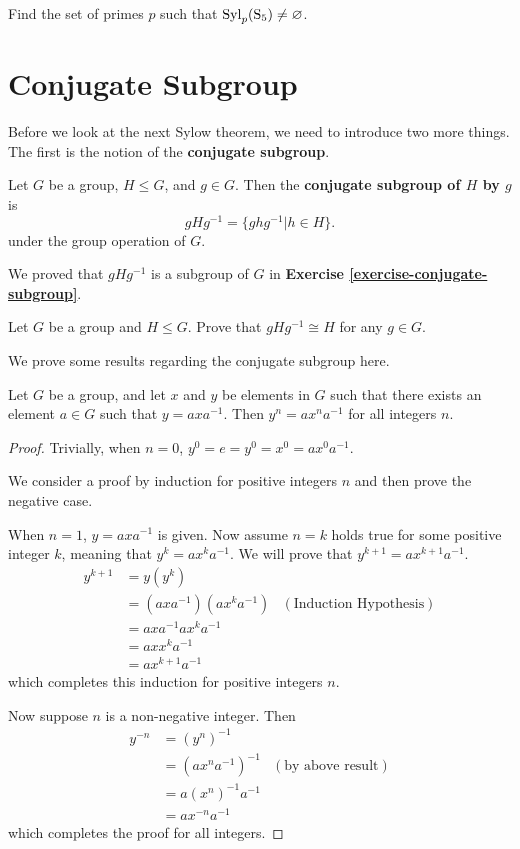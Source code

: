 \begin{exercise}
    Find the set of primes $p$ such that $\mathrm{Syl}_{p}(\mathrm{S}_{5}) \neq \varnothing$.
\end{exercise}

\section{Conjugate Subgroup}
Before we look at the next Sylow theorem, we need to introduce two more things. The first is the notion of the \textbf{conjugate subgroup}.
\begin{definition}
    Let $G$ be a group, $H \leq G$, and $g \in G$. Then the \textbf{conjugate subgroup of $H$ by $g$} is
    \[
        gHg^{-1} = \{ghg^{-1} \vert h \in H\}.
    \]
    under the group operation of $G$.
\end{definition}
We proved that $gHg^{-1}$ is a subgroup of $G$ in \textbf{Exercise \ref{exercise-conjugate-subgroup}}.

\begin{exercise}\label{exercise-conjugate-subgroup-isomorphic-to-subgroup}
    Let $G$ be a group and $H \leq G$. Prove that $gHg^{-1} \cong H$ for any $g \in G$.
\end{exercise}

We prove some results regarding the conjugate subgroup here.
\begin{proposition}\label{prop-power-of-conjugate-equals-conjugate-of-power}
    Let $G$ be a group, and let $x$ and $y$ be elements in $G$ such that there exists an element $a \in G$ such that $y = axa^{-1}$. Then $y^n = ax^na^{-1}$ for all integers $n$.
\end{proposition}
\begin{proof}
    Trivially, when $n = 0$, $y^0 = e = y^0 = x^0 = ax^0a^{-1}$.

    We consider a proof by induction for positive integers $n$ and then prove the negative case.

    When $n = 1$, $y = axa^{-1}$ is given. Now assume $n = k$ holds true for some positive integer $k$, meaning that $y^k = ax^ka^{-1}$. We will prove that $y^{k+1} = ax^{k+1}a^{-1}$.
    \begin{align*}
        y^{k+1} &= y(y^k)\\
        &= (axa^{-1})(ax^ka^{-1}) & (\text{Induction Hypothesis})\\
        &= axa^{-1}ax^ka^{-1}\\
        &= axx^ka^{-1}\\
        &= ax^{k+1}a^{-1}
    \end{align*}
    which completes this induction for positive integers $n$.

    Now suppose $n$ is a non-negative integer. Then
    \begin{align*}
        y^{-n} &= (y^n)^{-1}\\
        &= (ax^na^{-1})^{-1} & (\text{by above result})\\
        &= a(x^n)^{-1}a^{-1}\\
        &= ax^{-n}a^{-1}
    \end{align*}
    which completes the proof for all integers.
\end{proof}

